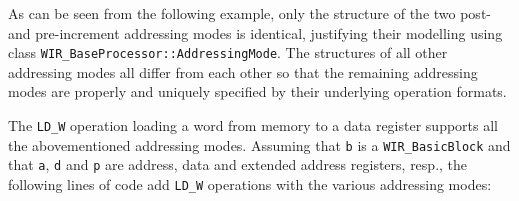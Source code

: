 As can be seen from the following example, only the structure of the two post- and pre-increment addressing modes is identical, justifying their modelling using class \texttt{WIR\_BaseProcessor::AddressingMode}.
The structures of all other addressing modes all differ from each other so that the remaining addressing modes are properly and uniquely specified by their underlying operation formats.

\begin{wirExample}
The \texttt{LD\_W} operation loading a word from memory to a data register supports all the abovementioned addressing modes.
Assuming that \texttt{b} is a \texttt{WIR\_BasicBlock} and that \texttt{a}, \texttt{d} and \texttt{p} are address, data and extended address registers, resp., the following lines of code add \texttt{LD\_W} operations with the various addressing modes:


\end{wirExample}

